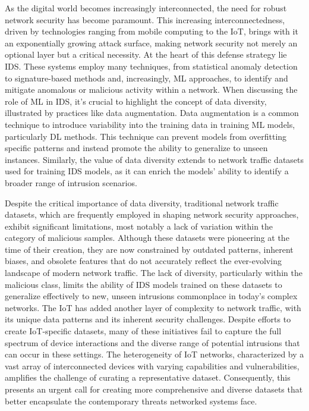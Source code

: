 \documentclass[lettersize,journal]{IEEEtran}
\begin{document}
As the digital world becomes increasingly interconnected, the need for robust network security has become paramount. This increasing interconnectedness, driven by technologies ranging from mobile computing to the \ac{IoT}, brings with it an exponentially growing attack surface, making network security not merely an optional layer but a critical necessity. At the heart of this defense strategy lie \ac{IDS}. These systems employ many techniques, from statistical anomaly detection to signature-based methods and, increasingly, \ac{ML} approaches, to identify and mitigate anomalous or malicious activity within a network. When discussing the role of \ac{ML} in IDS, it's crucial to highlight the concept of data diversity, illustrated by practices like data augmentation. Data augmentation is a common technique to introduce variability into the training data in training \ac{ML} models, particularly \ac{DL} methods. This technique can prevent models from overfitting specific patterns and instead promote the ability to generalize to unseen instances. Similarly, the value of data diversity extends to network traffic datasets used for training IDS models, as it can enrich the models' ability to identify a broader range of intrusion scenarios.

Despite the critical importance of data diversity, traditional network traffic datasets, which are frequently employed in shaping network security approaches, exhibit significant limitations, most notably a lack of variation within the category of malicious samples. Although these datasets were pioneering at the time of their creation, they are now constrained by outdated patterns, inherent biases, and obsolete features that do not accurately reflect the ever-evolving landscape of modern network traffic. The lack of diversity, particularly within the malicious class, limits the ability of IDS models trained on these datasets to generalize effectively to new, unseen intrusions commonplace in today's complex networks. The \ac{IoT} has added another layer of complexity to network traffic, with its unique data patterns and its inherent security challenges. Despite efforts to create IoT-specific datasets, many of these initiatives fail to capture the full spectrum of device interactions and the diverse range of potential intrusions that can occur in these settings. The heterogeneity of IoT networks, characterized by a vast array of interconnected devices with varying capabilities and vulnerabilities, amplifies the challenge of curating a representative dataset. Consequently, this presents an urgent call for creating more comprehensive and diverse datasets that better encapsulate the contemporary threats networked systems face. 
\end{document}
